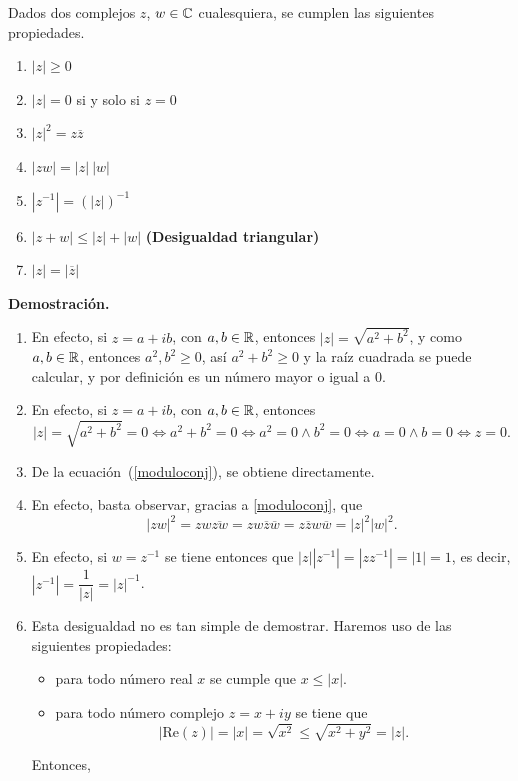 \begin{prop}
Dados dos complejos $z$, $w\in\mathbb{C}$ cualesquiera, se cumplen las siguientes propiedades.
\begin{enumerate}
\item $|z|\ge0$
\item $|z|=0$ si y solo si $z=0$
\item $|z|^2=z\overline{z}$
\item $|zw|=|z|\ |w|$
\item $|z^{-1}|=(|z|)^{-1}$
\item $|z+w|\le|z|+|w|$ {\bf (Desigualdad triangular)}
\item $|z|=|\overline{z}|$
\end{enumerate}
\end{prop}
{\bf Demostración.}
\begin{enumerate}
	\item 	
	En efecto, si $z=a+ib$, con $a,b\in\mathbb{R}$, entonces $|z|=\sqrt{a^2+b^2}$, y como $a,b\in\mathbb{R}$, entonces $a^2,b^2\ge 0$, así $a^2+b^2\ge 0$ y la raíz cuadrada se puede calcular, y por definición es un número mayor o igual a 0.
	\item 
	En efecto, si $z=a+ib$, con $a,b\in\mathbb{R}$, entonces 	
$$|z|=\sqrt{a^2+b^2}=0\Leftrightarrow {a^2+b^2}=0\Leftrightarrow a^2=0\wedge b^2=0\Leftrightarrow a=0\wedge b=0\Leftrightarrow z=0.$$
	\item De la ecuación~(\ref{moduloconj}), se obtiene directamente.
	\item 
	En efecto, basta observar, gracias a \eqref{moduloconj}, que
    \[
		|z w|^2 = z w \overline{z w} = z w \overline{z}  \overline{w} = z \overline{z} w \overline{w}
			= |z|^2 |w|^2.
    \]		
	\item 	
	En efecto, si $w = z^{-1}$ se tiene entonces que
            $|z| |z^{-1}| = |z z^{-1}| = |1| = 1$, es decir,
            $\left|z^{-1}\right| = \dfrac{1}{|z|} = |z|^{-1}$.
	\item Esta desigualdad no es tan simple de demostrar.
	Haremos uso de las siguientes propiedades: 
	\begin{itemize}
        \item para todo n\'umero real $x$ se cumple que $x \le |x|$.
        \item para todo n\'umero complejo $z = x + i y$ se tiene que 
            \[
                |\mbox{Re}(z)| = |x| = \sqrt{x^2} \le \sqrt{x^2 + y^2} = |z|.
            \]
	\end{itemize}
    Entonces,        
	\begin{align*}

\end{align*}
\end{enumerate}
